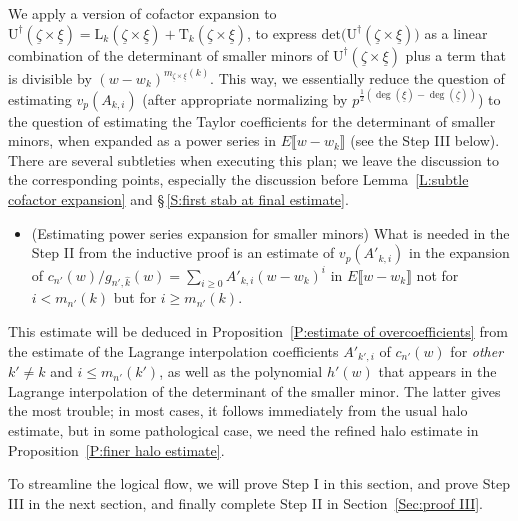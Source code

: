 \documentclass[12pt]{amsart}
\theoremstyle{definition}
\numberwithin{equation}{subsection}
\def\rmL{\mathrm{L}}
\def\rmU{\mathrm{U}}
\def\rmT{\mathrm{T}}
\renewcommand{\det}{\mathrm{det}}
\begin{document}
We apply a version of cofactor expansion to $\rmU^\dagger(\underline \zeta \times \underline \xi) = \rmL_k(\underline \zeta \times \underline \xi) + \rmT_k(\underline \zeta \times \underline \xi)$, to express $\det \big(\rmU^\dagger(\underline \zeta \times \underline \xi)\big)$ as a linear combination of the determinant of smaller minors of $\rmU^\dagger(\underline \zeta \times \underline \xi)$ plus a term that is divisible by $(w-w_k)^{m_{\underline \zeta\times \underline \xi}(k)}$. This way, we essentially reduce the question of estimating $v_p(A_{k,i})$ (after appropriate normalizing by $p^{\frac 12(\deg(\underline \xi)-\deg (\underline \zeta))}$) to the question of estimating the Taylor coefficients for the determinant of smaller minors, when expanded as a power series in $E\llbracket w-w_k\rrbracket$ (see the Step III below). 
There are several subtleties when executing this plan; we leave the discussion to the corresponding points, especially the discussion before Lemma~\ref{L:subtle cofactor expansion} and \S\,\ref{S:first stab at final estimate}. 


\begin{itemize}
\item [\underline{Step III}:] (Estimating power series expansion for smaller minors) 
What is needed in the Step II from the inductive proof is an estimate of  $v_p(A'_{k,i})$ in the expansion of $c_{n'}(w) / g_{n', \hat k}(w)= \sum\limits_{i \geq 0} A'_{k, i}(w-w_k)^i$ in $E\llbracket w-w_k\rrbracket $ not for $i< m_{n'}(k)$ but for $i \geq m_{n'}(k)$.
\end{itemize}
This estimate will be deduced in Proposition~\ref{P:estimate of overcoefficients} from the estimate of the Lagrange interpolation coefficients $A'_{k',i}$ of $c_{n'}(w)$ for \emph{other} $k' \neq k$ and $i\leq m_{n'}(k')$, as well as the polynomial $h'(w)$ that appears in the Lagrange interpolation of the determinant of the smaller minor. The latter gives the most trouble; in most cases, it follows immediately from the usual halo estimate, but in some pathological case, we need the refined halo estimate in Proposition~\ref{P:finer halo estimate}.

To streamline the logical flow, we will prove Step I in this section, and prove Step III in the next section, and finally complete Step II in Section~\ref{Sec:proof III}.




\end{document}
